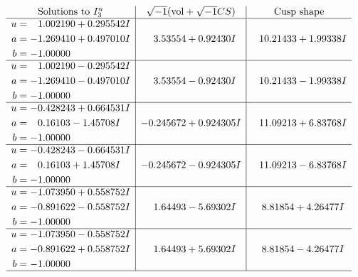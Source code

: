 \documentclass[1p]{elsarticle_modified}
\theoremstyle{definition}
\newcommand{\I}{\sqrt{-1}}
\begin{document}
$$\begin{array}{c|c|c}  
\text{Solutions to }I^u_{3}& \I (\text{vol} + \sqrt{-1}CS) & \text{Cusp shape}\\
 \hline 
\begin{aligned}
u &= \phantom{-}1.002190 + 0.295542 I \\
a &= -1.269410 + 0.497010 I \\
b &= -1.00000\phantom{ +0.000000I}\end{aligned}
 & \phantom{-}3.53554 + 0.92430 I & \phantom{-}10.21433 + 1.99338 I \\ \hline\begin{aligned}
u &= \phantom{-}1.002190 - 0.295542 I \\
a &= -1.269410 - 0.497010 I \\
b &= -1.00000\phantom{ +0.000000I}\end{aligned}
 & \phantom{-}3.53554 - 0.92430 I & \phantom{-}10.21433 - 1.99338 I \\ \hline\begin{aligned}
u &= -0.428243 + 0.664531 I \\
a &= \phantom{-}0.16103 - 1.45708 I \\
b &= -1.00000\phantom{ +0.000000I}\end{aligned}
 & -0.245672 + 0.924305 I & \phantom{-}11.09213 + 6.83768 I \\ \hline\begin{aligned}
u &= -0.428243 - 0.664531 I \\
a &= \phantom{-}0.16103 + 1.45708 I \\
b &= -1.00000\phantom{ +0.000000I}\end{aligned}
 & -0.245672 - 0.924305 I & \phantom{-}11.09213 - 6.83768 I \\ \hline\begin{aligned}
u &= -1.073950 + 0.558752 I \\
a &= -0.891622 - 0.558752 I \\
b &= -1.00000\phantom{ +0.000000I}\end{aligned}
 & \phantom{-}1.64493 - 5.69302 I & \phantom{-}8.81854 + 4.26477 I \\ \hline\begin{aligned}
u &= -1.073950 - 0.558752 I \\
a &= -0.891622 + 0.558752 I \\
b &= -1.00000\phantom{ +0.000000I}\end{aligned}
 & \phantom{-}1.64493 + 5.69302 I & \phantom{-}8.81854 - 4.26477 I\\
 \hline 
 \end{array}$$\newpage\newpage\renewcommand{\arraystretch}{1}
\end{document}
